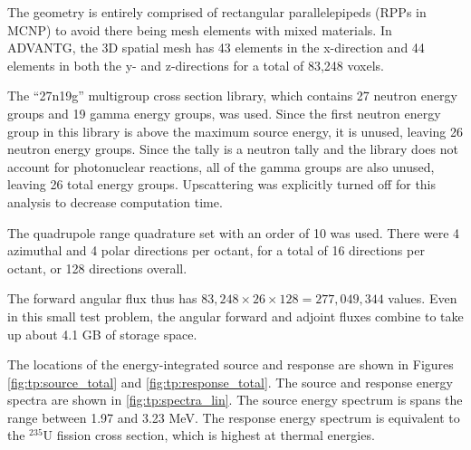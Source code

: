 The geometry is entirely comprised of rectangular parallelepipeds (RPPs in MCNP) to avoid there being mesh elements with mixed materials.
In ADVANTG, the 3D spatial mesh has 43 elements in the x-direction and 44 elements in both the y- and z-directions for a total of 83,248 voxels.

The ``27n19g'' multigroup cross section library, which contains 27 neutron energy groups and 19 gamma energy groups, was used.
Since the first neutron energy group in this library is above the maximum source energy, it is unused, leaving 26 neutron energy groups.
Since the tally is a neutron tally and the library does not account for photonuclear reactions, all of the gamma groups are also unused, leaving 26 total energy groups.
Upscattering was explicitly turned off for this analysis to decrease computation time.

The quadrupole range quadrature set with an order of 10 was used.
There were 4 azimuthal and 4 polar directions per octant, for a total of 16 directions per octant, or 128 directions overall.

The forward angular flux thus has $83,248 \times 26 \times 128 = 277,049,344$ values.
Even in this small test problem, the angular forward and adjoint fluxes combine to take up about 4.1 GB of storage space.

The locations of the energy-integrated source and response are shown in Figures \ref{fig:tp:source_total} and \ref{fig:tp:response_total}.
The source and response energy spectra are shown in \ref{fig:tp:spectra_lin}.
The source energy spectrum is spans the range between 1.97 and 3.23 MeV.
The response energy spectrum is equivalent to the ${}^{235}\text{U}$ fission cross section, which is highest at thermal energies.

